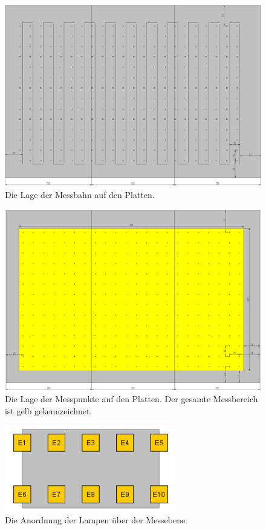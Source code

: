 \documentclass[a4paper,bibtotoc,oneside]{scrbook}
\begin{document}
\begin{figure}[htbp]
\centering
\includegraphics[width=125mm]{img/dreiplatten10.png}
\caption{Die Lage der Messbahn auf den Platten.}\label{platten}
\end{figure}

\begin{figure}[htbp]
\centering
\includegraphics[width=125mm]{img/punkte.png}
\caption{Die Lage der Messpunkte auf den Platten. Der gesamte Messbereich ist gelb gekennzeichnet.}\label{punkte}
\end{figure}

\begin{figure}[htbp]
\centering
\includegraphics[width=75mm]{img/lampen.png}
\caption{Die Anordnung der Lampen über der Messebene.}\label{Lampen}
\end{figure}
\end{document}
